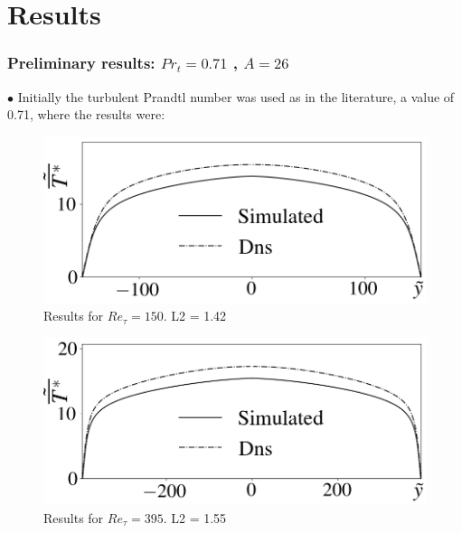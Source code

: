 \documentclass[xcolor=dvipsnames,8pt,aspectratio=34]{beamer}
\begin{document}
	\section{Results}
		\begin{frame}
			\frametitle{Preliminary results: $Pr_t= 0.71$ , $A = 26 $}
				$\bullet$ Initially the turbulent Prandtl number was used as in the literature, a value of 0.71, where the results were:\\
			\begin{minipage}[h!]{0.5\textwidth}
			\begin{figure}
				\centering
				\includegraphics[angle=0, scale=0.24]{fotos_formatacao_final/Temperature_150_071_classico}
				\caption{Results for $Re_\tau = 150$. L2 = 1.42 }
			\end{figure}
			\end{minipage}
				\begin{minipage}[h!]{0.49\textwidth}
				\begin{figure}
					\centering
					\includegraphics[angle=0, scale=0.24]{fotos_formatacao_final/Temperature_395_071_classico}
					\caption{Results for $Re_\tau = 395$. L2 = 1.55}
				\end{figure}
			\end{minipage}	\\
			\begin{minipage}[h!]{0.5\textwidth}
				\begin{figure}

\end{figure}
\end{minipage}
\end{frame}
\end{document}
